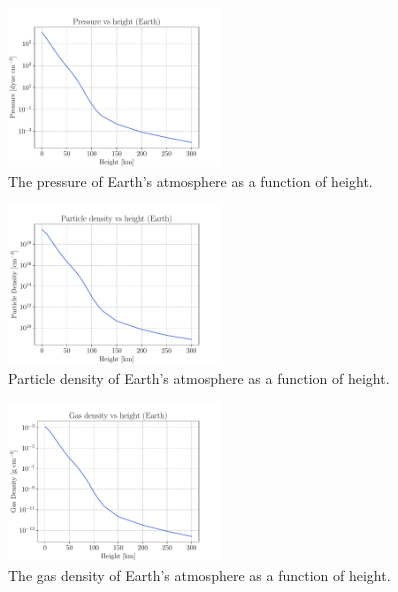 \documentclass[a4paper,11.5pt,]{article}
\begin{document}
\begin{multicols}{2}
\begin{figure}[H]
    \centering
    \includegraphics[width = 0.5\textwidth]{figures/1.3/Earth_pressure.pdf}
    \caption{The pressure of Earth's atmosphere as a function of height.}
    \label{fig: earth pressure}
\end{figure}

\begin{figure}[H]
    \centering
    \includegraphics[width = 0.5\textwidth]{figures/1.3/Earth_particledensity.pdf}
    \caption{Particle density of Earth's atmosphere as a function of height.}
    \label{fig: earth part dens}
\end{figure}

\begin{figure}[H]
    \centering
    \includegraphics[width = 0.5\textwidth]{figures/1.3/Earth_gasdensity.pdf}
    \caption{The gas density of Earth's atmosphere as a function of height.}
    \label{fig: earth gas dens}
\end{figure}


\end{multicols}
\end{document}
